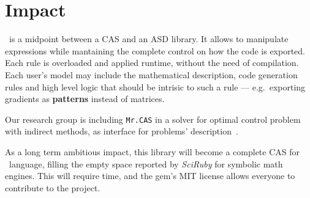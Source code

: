 
\section{Impact}
\label{sec:impact}

\ragnicas~is a midpoint between a CAS and an ASD library. It allows to manipulate expressions while mantaining the complete control on how the code is exported. Each rule is overloaded and applied runtime, without the need of compilation. Each user's model may include the mathematical description, code generation rules and high level logic that should be intrisic to such a rule --- e.g.~exporting gradients as \textbf{patterns} instead of matrices.

Our research group is including \texttt{Mr.CAS} in a solver for optimal control problem with indirect methods, as interface for problems' description~\cite{biral2016notes}.

As a long term ambitious impact, this library will become a complete CAS for \Ruby~language, filling the empty space reported by \emph{SciRuby} for symbolic math engines. This will require time, and the gem's MIT license allows everyone to contribute to the project.
